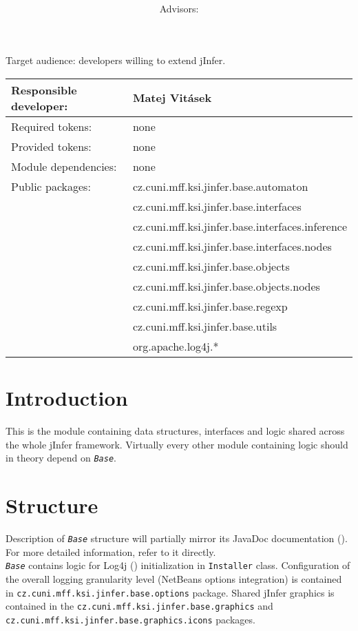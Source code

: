 \documentclass[a4paper,10pt,oneside]{article}
\title{\bf\mftitle}
\author{\mfauthor \\ Advisors: \mfadvisor}
\date{\mfplacedate}
\newcommand{\code}[1]{\texttt{#1}}
\newcommand{\jmodule}[1]{\texttt{\textit{#1}}}
\begin{document}
\maketitle
\noindent Target audience: developers willing to extend jInfer.

\noindent \begin{tabular}{|l|l|} \hline
Responsible developer: & Matej Vitásek \\ \hline
Required tokens:       & none \\ \hline
Provided tokens:       & none \\ \hline
Module dependencies:   & none \\ \hline
Public packages:       & cz.cuni.mff.ksi.jinfer.base.automaton \\ 
& cz.cuni.mff.ksi.jinfer.base.interfaces \\ 
& cz.cuni.mff.ksi.jinfer.base.interfaces.inference \\ 
& cz.cuni.mff.ksi.jinfer.base.interfaces.nodes \\
& cz.cuni.mff.ksi.jinfer.base.objects \\ 
& cz.cuni.mff.ksi.jinfer.base.objects.nodes \\ 
& cz.cuni.mff.ksi.jinfer.base.regexp \\ 
& cz.cuni.mff.ksi.jinfer.base.utils \\
& org.apache.log4j.* \\ \hline
\end{tabular}

\section{Introduction}

This is the module containing data structures, interfaces and logic shared across the whole jInfer framework. Virtually every other module containing logic should in theory depend on \jmodule{Base}.

\section{Structure}

Description of \jmodule{Base} structure will partially mirror its JavaDoc documentation (\cite{javadoc}). For more detailed information, refer to it directly.\\

\jmodule{Base} contains logic for Log4j (\cite{log4j}) initialization in \code{Installer} class. Configuration of the overall logging granularity level (NetBeans options integration) is contained in \code{cz.cuni.mff.ksi.jinfer.base.options} package. Shared jInfer graphics is contained in the \code{cz.cuni.mff.ksi.jinfer.base.graphics} and \code{cz.cuni.mff.ksi.jinfer.base.graphics.icons} packages.
\end{document}
